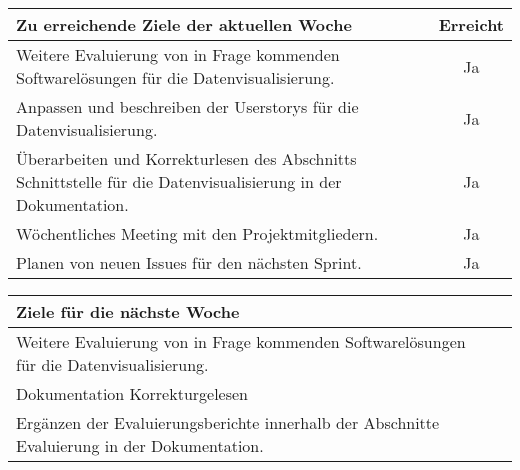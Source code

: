 \begin{tabularx}{\textwidth}{Xc}
    \arrayrulecolor{OliveGreen}
    \toprule
    {\bfseries Zu erreichende Ziele der aktuellen Woche} & {\bfseries Erreicht} \\
    \midrule[2pt]
    Weitere Evaluierung von in Frage kommenden Softwarelösungen für die
    Datenvisualisierung.     &Ja               \\
    \rowcolor{OliveGreen!15}
    Anpassen und beschreiben der Userstorys für die Datenvisualisierung.  &Ja \\
    \rowcolor{White}
    Überarbeiten und Korrekturlesen des Abschnitts Schnittstelle für die
    Datenvisualisierung in der Dokumentation.    &Ja               \\
    \rowcolor{OliveGreen!15}
    Wöchentliches Meeting mit den Projektmitgliedern.  &Ja \\
    \rowcolor{White}
    Planen von neuen Issues für den nächsten Sprint. &Ja \\
    \bottomrule[2pt]
\end{tabularx}
%
\vspace{1cm}
%
\begin{tabularx}{\textwidth}{Xc}
    \arrayrulecolor{OliveGreen}
    \toprule
    {\bfseries Ziele für die nächste Woche}        &                         \\
    \midrule[2pt]
    Weitere Evaluierung von in Frage kommenden Softwarelösungen für die
    Datenvisualisierung.   &                         \\
    \rowcolor{OliveGreen!15}
    Dokumentation Korrekturgelesen                 &                         \\
    \rowcolor{White}
    Ergänzen der Evaluierungsberichte innerhalb der Abschnitte Evaluierung in
    der Dokumentation. &       \\
\end{tabularx}
